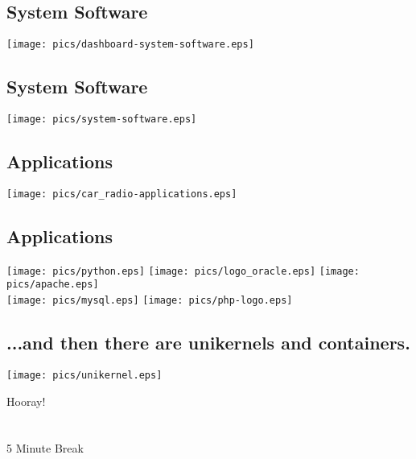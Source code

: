 \documentclass[xga]{xdvislides}
\begin{document}
\subsection{System Software}
\begin{center}
	\texttt{[image: pics/dashboard-system-software.eps]}
\end{center}

\subsection{System Software}
\begin{center}
	\texttt{[image: pics/system-software.eps]}
\end{center}

\subsection{Applications}
\begin{center}
	\texttt{[image: pics/car\_radio-applications.eps]}
\end{center}

\subsection{Applications}
\begin{center}
	\texttt{[image: pics/python.eps]}
	\texttt{[image: pics/logo\_oracle.eps]}
	\texttt{[image: pics/apache.eps]} \\
	\texttt{[image: pics/mysql.eps]}
	\texttt{[image: pics/php-logo.eps]}
\end{center}

\subsection{...and then there are unikernels and containers.}
\vfill
\begin{center}
	\texttt{[image: pics/unikernel.eps]}
\end{center}
\vfill

\newpage
\vspace*{\fill}
\begin{center}
    \Hugesize
        Hooray! \\ [1em]
    \hspace*{5mm}
    \blueline\\
    \hspace*{5mm}\\
        5 Minute Break
\end{center}
\vspace*{\fill}
\end{document}
